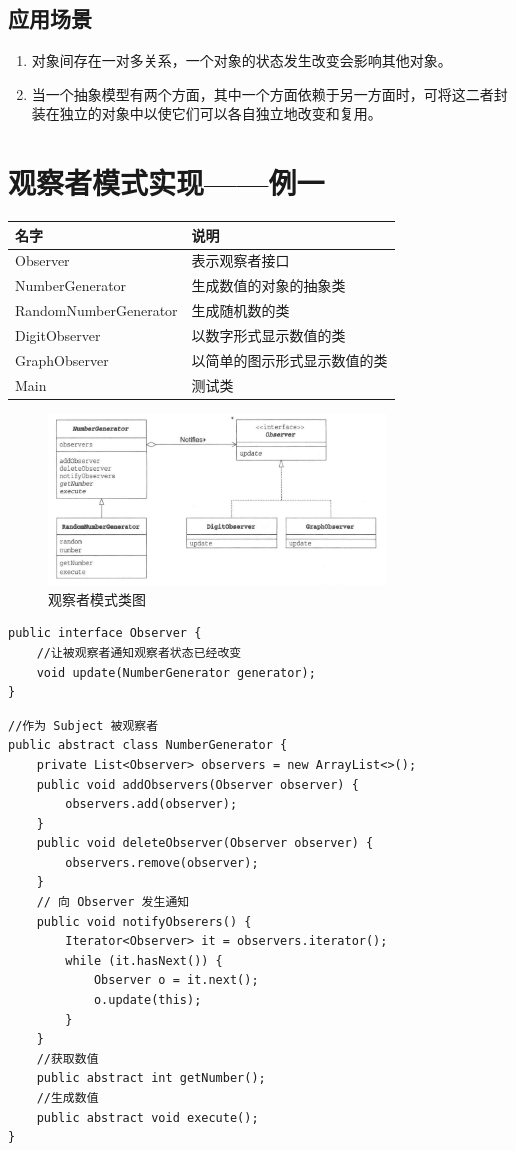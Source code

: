 \subsection{应用场景}
\begin{enumerate}
	\item 对象间存在一对多关系，一个对象的状态发生改变会影响其他对象。
	\item 当一个抽象模型有两个方面，其中一个方面依赖于另一方面时，可将这二者封装在独立的对象中以使它们可以各自独立地改变和复用。
\end{enumerate}
\section{观察者模式实现——例一}
\begin{table}[!h]
	\begin{tabular}{|l|l|}
		\hline
		名字&说明\\
		\hline
		Observer&表示观察者接口\\
		\hline
		NumberGenerator&生成数值的对象的抽象类\\
		\hline
		RandomNumberGenerator&生成随机数的类\\
		\hline
		DigitObserver&以数字形式显示数值的类\\
		\hline
		GraphObserver&以简单的图示形式显示数值的类\\
		\hline
		Main&测试类\\
		\hline
	\end{tabular}
\end{table}
\begin{figure}[!h]
	\centering
	\includegraphics[width=0.8\textwidth]{image/17-1}
	\caption{观察者模式类图}
\end{figure}
\begin{lstlisting}
public interface Observer {
	//让被观察者通知观察者状态已经改变
	void update(NumberGenerator generator);
}
\end{lstlisting}
\begin{lstlisting}
//作为 Subject 被观察者
public abstract class NumberGenerator {
	private List<Observer> observers = new ArrayList<>();
	public void addObservers(Observer observer) {
		observers.add(observer);
	}
	public void deleteObserver(Observer observer) {
		observers.remove(observer);
	}
	// 向 Observer 发生通知
	public void notifyObserers() {
		Iterator<Observer> it = observers.iterator();
		while (it.hasNext()) {
			Observer o = it.next();
			o.update(this);
		}
	}
	//获取数值
	public abstract int getNumber();
	//生成数值
	public abstract void execute();
}
\end{lstlisting}
